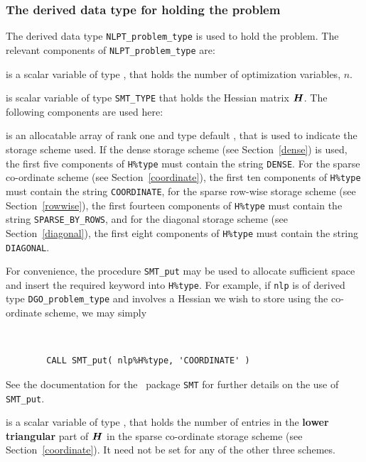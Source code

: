 \documentclass{galahad}
\newcommand{\packagename}{DGO}
\begin{document}

\subsubsection{The derived data type for holding the problem}\label{typeprob}
The derived data type {\tt NLPT\_problem\_type} is used to hold
the problem. The relevant components of
{\tt NLPT\_problem\_type}
are:

\begin{description}

 is a scalar variable of type \integer,
 that holds the number of optimization variables, $n$.

 is scalar variable of type {\tt SMT\_TYPE}
that holds the Hessian matrix ${\bm{H}}$. The following components
are used here:

\begin{description}

 is an allocatable array of rank one and type default
\character, that
is used to indicate the storage scheme used. If the dense storage scheme
(see Section~\ref{dense}) is used,
the first five components of {\tt H\%type} must contain the
string {\tt DENSE}.
For the sparse co-ordinate scheme (see Section~\ref{coordinate}),
the first ten components of {\tt H\%type} must contain the
string {\tt COORDINATE},
for the sparse row-wise storage scheme (see Section~\ref{rowwise}),
the first fourteen components of {\tt H\%type} must contain the
string {\tt SPARSE\_BY\_ROWS},
and for the diagonal storage scheme (see Section~\ref{diagonal}),
the first eight components of {\tt H\%type} must contain the
string {\tt DIAGONAL}.

For convenience, the procedure {\tt SMT\_put}
may be used to allocate sufficient space and insert the required keyword
into {\tt H\%type}.
For example, if {\tt nlp} is of derived type {\tt \packagename\_problem\_type}
and involves a Hessian we wish to store using the co-ordinate scheme,
we may simply
{\tt
\begin{verbatim}
        CALL SMT_put( nlp%H%type, 'COORDINATE' )
\end{verbatim}
}
\noindent
See the documentation for the \galahad\ package {\tt SMT}
for further details on the use of {\tt SMT\_put}.

 is a scalar variable of type \integer, that
holds the number of entries in the {\bf lower triangular} part of ${\bm{H}}$
in the sparse co-ordinate storage scheme (see Section~\ref{coordinate}).
It need not be set for any of the other three schemes.


\end{description}
\end{description}
\end{document}
